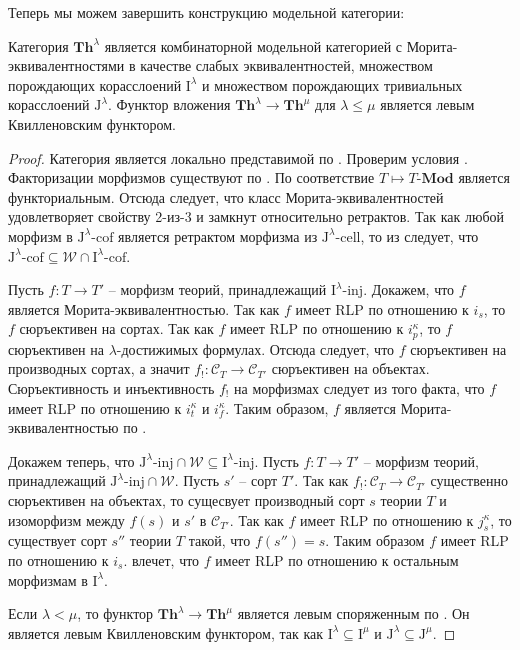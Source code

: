 \documentclass[reqno]{amsart}
\theoremstyle{definition}
\theoremstyle{remark}
\newcommand{\bcat}[1]{\mathbf{#1}}
\newcommand{\cat}[1]{\mathcal{#1}}
\newcommand{\we}{\mathcal{W}}
\newcommand{\Mod}[1]{#1\text{-}\bcat{Mod}}
\newcommand{\Th}{\bcat{Th}}
\newcommand{\I}{\mathrm{I}}
\newcommand{\J}{\mathrm{J}}
\newcommand{\class}[2]{#1\text{-}\mathrm{#2}}
\newcommand{\Iinj}[1][\I]{\class{#1}{inj}}
\newcommand{\Icell}[1][\I]{\class{#1}{cell}}
\newcommand{\Icof}[1][\I]{\class{#1}{cof}}
\begin{document}
Теперь мы можем завершить конструкцию модельной категории:

\begin{thm}
Категория $\Th^\lambda$ является комбинаторной модельной категорией с Морита-эквивалентностями в качестве слабых эквивалентностей, множеством порождающих корасслоений $\I^\lambda$ и множеством порождающих тривиальных корасслоений $\J^\lambda$.
Функтор вложения $\Th^\lambda \to \Th^\mu$ для $\lambda \leq \mu$ является левым Квилленовским функтором.
\end{thm}
\begin{proof}
Категория является локально представимой по .
Проверим условия .
Факторизации морфизмов существуют по .
По  соответствие $T \mapsto \Mod{T}$ является функториальным.
Отсюда следует, что класс Морита-эквивалентностей удовлетворяет свойству 2-из-3 и замкнут относительно ретрактов.
Так как любой морфизм в $\Icof[\J^\lambda]$ является ретрактом морфизма из $\Icell[\J^\lambda]$, то из  следует, что $\Icof[\J^\lambda] \subseteq \we \cap \Icof[\I^\lambda]$.

Пусть $f : T \to T'$ -- морфизм теорий, принадлежащий $\Iinj[\I^\lambda]$.
Докажем, что $f$ является Морита-эквивалентностью.
Так как $f$ имеет RLP по отношению к $i_s$, то $f$ сюръективен на сортах.
Так как $f$ имеет RLP по отношению к $i_p^\kappa$, то $f$ сюръективен на $\lambda$-достижимых формулах.
Отсюда следует, что $f$ сюръективен на производных сортах, а значит $f_! : \cat{C}_T \to \cat{C}_{T'}$ сюръективен на объектах.
Сюръективность и инъективность $f_!$ на морфизмах следует из того факта, что $f$ имеет RLP по отношению к $i_t^\kappa$ и $i_f^\kappa$.
Таким образом, $f$ является Морита-эквивалентностью по .

Докажем теперь, что $\Iinj[\J^\lambda] \cap \we \subseteq \Iinj[\I^\lambda]$.
Пусть $f : T \to T'$ -- морфизм теорий, принадлежащий $\Iinj[\J^\lambda] \cap \we$.
Пусть $s'$ -- сорт $T'$.
Так как $f_! : \cat{C}_T \to \cat{C}_{T'}$ существенно сюръективен на объектах, то сущесвует производный сорт $s$ теории $T$ и изоморфизм между $f(s)$ и $s'$ в $\cat{C}_{T'}$.
Так как $f$ имеет RLP по отношению к $j_s^\kappa$, то существует сорт $s''$ теории $T$ такой, что $f(s'') = s$.
Таким образом $f$ имеет RLP по отношению к $i_s$.
 влечет, что $f$ имеет RLP по отношению к остальным морфизмам в $\I^\lambda$.

Если $\lambda < \mu$, то функтор $\Th^\lambda \to \Th^\mu$ является левым споряженным по .
Он является левым Квилленовским функтором, так как $\I^\lambda \subseteq \I^\mu$ и $\J^\lambda \subseteq \J^\mu$.
\end{proof}
\end{document}
